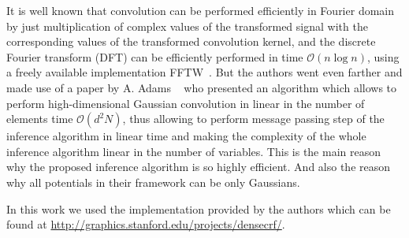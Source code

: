 It is well known that convolution can be performed efficiently in Fourier domain by just multiplication of complex values
of the transformed signal with the corresponding values of the transformed convolution kernel, and the discrete 
Fourier transform (DFT) can be efficiently performed in time $\mathcal{O}(n\log{n})$, \eg using a freely available implementation
FFTW~\cite{fftw}. But the authors went even farther and made use of a paper by A. Adams \etal~\cite{Adams2010} who presented
an algorithm which allows to perform high-dimensional Gaussian convolution in linear in the number of elements time
$\mathcal{O}(d^2 N)$, thus allowing to perform message passing step of the inference algorithm in linear time and making
the complexity of the whole inference algorithm linear in the number of variables. This is the main reason why the proposed
inference algorithm is so highly efficient. And also the reason why all potentials in their framework can be only Gaussians.

In this work we used the implementation provided by the authors which can be found at
\url{http://graphics.stanford.edu/projects/densecrf/}.